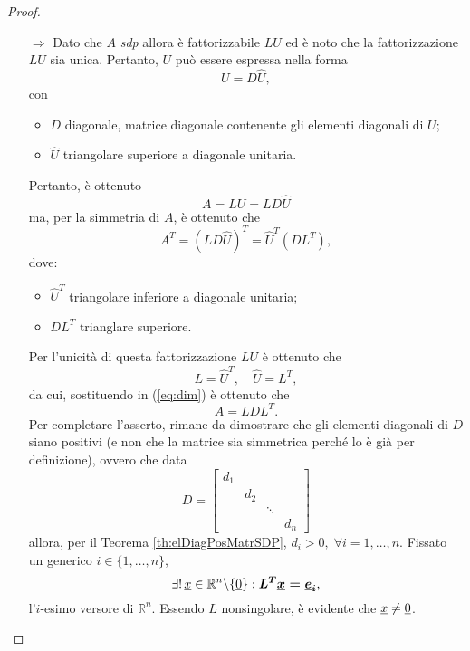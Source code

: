 \begin{proof}
\begin{itemize}
        \item[$\Rightarrow$] Dato che $A$ \textit{sdp} allora è fattorizzabile $LU$ ed è noto che la fattorizzazione $LU$ sia unica. Pertanto, $U$ può essere espressa nella forma
        \begin{equation*}
            U=D\widehat U,
        \end{equation*}
        con
        \begin{itemize}
        	\item  $D$ diagonale, matrice diagonale contenente gli elementi diagonali di $U$;
        	\item $\widehat U$ triangolare superiore a diagonale unitaria.
        \end{itemize}
        
        Pertanto, è ottenuto
        \begin{equation*}
            A = LU= LD\widehat U
        \end{equation*}
        ma, per la simmetria di $A$, è ottenuto che
        \begin{equation}\label{eq:dim}
        	A^T =\left(LD\widehat U\right)^T =  \widehat U^T\left(D L^T\right),
        \end{equation}
        dove:
        \begin{itemize}
            \item $\widehat U^T$ triangolare inferiore a diagonale unitaria;
            \item $DL^T$ trianglare superiore.
        \end{itemize}
        Per l'unicità di questa fattorizzazione $LU$ è ottenuto che
        \begin{equation*}
            L=\widehat U^T,\quad \widehat U=L^T,
        \end{equation*}
        da cui, sostituendo in (\ref{eq:dim}) è ottenuto che
        \begin{equation*}
        	A=LDL^T.
        \end{equation*}
        Per completare l'asserto, rimane da dimostrare che gli elementi diagonali di $D$ siano positivi (e non che la matrice sia simmetrica perché lo è già per definizione), ovvero che data
        \begin{equation*}
            D=
            \begin{bmatrix}
                d_1 \\
                & d_2\\
                & & \ddots \\
                & & & d_n
          \end{bmatrix}
        \end{equation*}
        allora, per il Teorema \ref{th:elDiagPosMatrSDP}, $d_i>0,\; \forall i = 1,\hdots,n$.
        Fissato un generico $i\in\{1,\hdots, n\}$,
        \begin{equation*}
        	\exists!\, \uline x\in\mathbb R^n\backslash\{\uline 0\}:\boldsymbol{L^T\uline x=\uline e_i},
        \end{equation*}
        l'$i$-esimo versore di $\mathbb R^n$.  Essendo $L$ \gls{nonsingolare}, è evidente che $\uline x \neq \uline 0$.
        

\end{itemize}
\end{proof}
